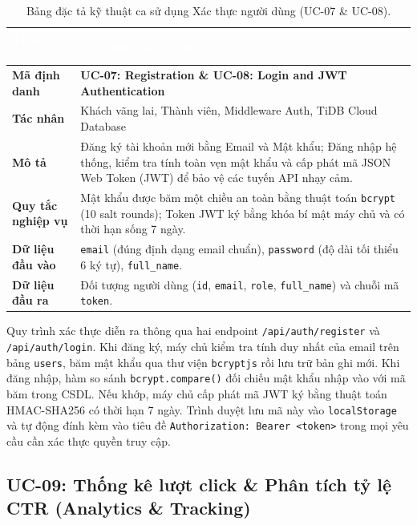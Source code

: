 \begin{table}[htbp]
\centering
\caption{Bảng đặc tả kỹ thuật ca sử dụng Xác thực người dùng (UC-07 \& UC-08).}
\label{tab:spec_uc_auth}
\small
\renewcommand{\arraystretch}{1.2}
\begin{tabularx}{\textwidth}{|p{3.2cm}|X|}
\hline
\rowcolor{PrimaryBlue}
\textcolor{white}{\textbf{Thuộc tính}} & \textcolor{white}{\textbf{Nội dung đặc tả chi tiết}} \\
\hline
\textbf{Mã định danh} & \textbf{UC-07: Registration \& UC-08: Login and JWT Authentication} \\
\hline
\textbf{Tác nhân} & Khách vãng lai, Thành viên, Middleware Auth, TiDB Cloud Database \\
\hline
\textbf{Mô tả} & Đăng ký tài khoản mới bằng Email và Mật khẩu; Đăng nhập hệ thống, kiểm tra tính toàn vẹn mật khẩu và cấp phát mã JSON Web Token (JWT) để bảo vệ các tuyến API nhạy cảm. \\
\hline
\textbf{Quy tắc nghiệp vụ} & Mật khẩu được băm một chiều an toàn bằng thuật toán \texttt{bcrypt} (10 salt rounds); Token JWT ký bằng khóa bí mật máy chủ và có thời hạn sống 7 ngày. \\
\hline
\textbf{Dữ liệu đầu vào} & \texttt{email} (đúng định dạng email chuẩn), \texttt{password} (độ dài tối thiểu 6 ký tự), \texttt{full\_name}. \\
\hline
\textbf{Dữ liệu đầu ra} & Đối tượng người dùng (\texttt{id}, \texttt{email}, \texttt{role}, \texttt{full\_name}) và chuỗi mã \texttt{token}. \\
\hline
\end{tabularx}
\end{table}

Quy trình xác thực diễn ra thông qua hai endpoint \texttt{/api/auth/register} và \texttt{/api/auth/login}. Khi đăng ký, máy chủ kiểm tra tính duy nhất của email trên bảng \texttt{users}, băm mật khẩu qua thư viện \texttt{bcryptjs} rồi lưu trữ bản ghi mới. Khi đăng nhập, hàm so sánh \texttt{bcrypt.compare()} đối chiếu mật khẩu nhập vào với mã băm trong CSDL. Nếu khớp, máy chủ cấp phát mã JWT ký bằng thuật toán HMAC-SHA256 có thời hạn 7 ngày. Trình duyệt lưu mã này vào \texttt{localStorage} và tự động đính kèm vào tiêu đề \texttt{Authorization: Bearer <token>} trong mọi yêu cầu cần xác thực quyền truy cập.

\subsection{UC-09: Thống kê lượt click \& Phân tích tỷ lệ CTR (Analytics \& Tracking)}

